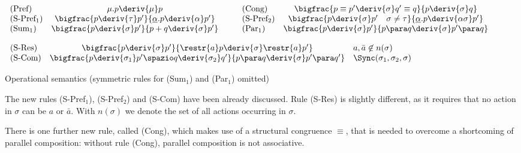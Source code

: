 \begin{table}[t]
{\renewcommand{\arraystretch}{2.8}
\hrulefill\\[-.4cm]

\begin{center}
$\begin{array}{lcllcl}
\mbox{(Pref)}  & \mu.p\deriv{\mu}p & & \; \; \;
\mbox{(Cong)} & \bigfrac{p \equiv p' \deriv{\sigma}q' \equiv q}{p\deriv{\sigma}q} \\
\mbox{(S-Pref$_1$)}  & \bigfrac{p\deriv{\tau}p'}{\underline{\alpha}.p\deriv{\alpha}p'} & & \; \; \;
\mbox{(S-Pref$_2$)}  & \bigfrac{p\deriv{\sigma}p' \quad \sigma \neq \tau}{\underline{\alpha}.p\deriv{\alpha\sigma}p'} \\
\mbox{(Sum$_1$)}  & \bigfrac{p\deriv{\sigma}p'}{p+q\deriv{\sigma}p'}  & & \; \; \;
\mbox{(Par$_1$)}  & \bigfrac{p\deriv{\sigma}p'}{p\para q\deriv{\sigma}p'\para q} \\
\end{array}$

$\begin{array}{lcllcl}
\mbox{(S-Res)}  & \bigfrac{p\deriv{\sigma}p'}{\restr{a}p\deriv{\sigma}
\restr{a}p'} & a, \bar{a} \not\in n(\sigma) \\
\mbox{(S-Com)}  & \bigfrac{p\deriv{\sigma_1} p'\spazio q\deriv{\sigma_2}q'}{p
\para q \deriv{\sigma}p'\para q'} & \Sync(\sigma_1,  \sigma_2, \sigma) \\
\end{array}$

\hrulefill
\end{center}}
\caption{Operational semantics (symmetric rules for (Sum$_1$) and (Par$_1$) omitted)}\label{m-rules}
\end{table}


The new rules (S-Pref$_1$), (S-Pref$_2$) and (S-Com) have been already discussed.
Rule (S-Res) is slightly different, as it requires that no action in $\sigma$ can be $a$ or $\bar{a}$.
With $n(\sigma)$ we denote the set of all actions occurring in $\sigma$.

There is one further new rule, called  (Cong), which makes use of a structural congruence $\equiv$,
that is needed to overcome a shortcoming of parallel composition: without rule (Cong), parallel
composition is not associative.

